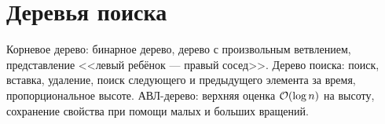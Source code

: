\section{Деревья поиска}
Корневое дерево:
бинарное дерево,
дерево с произвольным ветвлением,
представление <<левый ребёнок --- правый сосед>>.
Дерево поиска: поиск, вставка, удаление,
поиск следующего и предыдущего элемента за время,
пропорциональное высоте.
АВЛ-дерево: верхняя оценка $\mathcal{O}(\log n)$ на высоту,
сохранение свойства при помощи малых и больших вращений.
